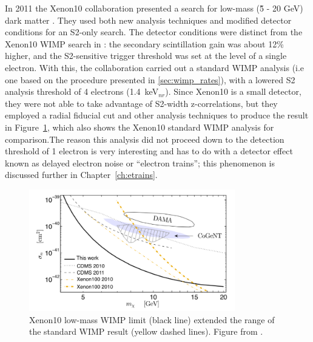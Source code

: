 In 2011 the Xenon10 collaboration presented a search for low-mass (\~5 - 20 GeV) dark matter \cite{Angle2011}. They used both new analysis techniques and modified detector conditions for an S2-only search. The detector conditions were distinct from the Xenon10 \ac{WIMP} search in \cite{Xenon10WIMP}: the secondary scintillation gain was about 12\% higher, and the S2-sensitive trigger threshold was set at the level of a single electron. With this, the collaboration carried out a standard \ac{WIMP} analysis (i.e one based on the procedure presented in \ref{sec:wimp_rates}), with a lowered S2 analysis threshold of 4 electrons (1.4~keV$_{nr}$). Since Xenon10 is a small detector, they were not able to take advantage of S2-width z-correlations, but they employed a radial fiducial cut and other analysis techniques to produce the result in Figure~\ref{fig:xenon10lowmass}, which also shows the Xenon10 standard \ac{WIMP} analysis for comparison.The reason this analysis did not proceed down to the detection threshold of 1 electron is very interesting and has to do with a detector effect known as delayed electron noise or ``electron trains''; this phenomenon is discussed further in Chapter~\ref{ch:etrains}. 

\begin{figure}[htbp]
\begin{center}
\includegraphics[width=0.8\textwidth]{figures/lxetpcs/xenon10lowmass.png}
\caption{Xenon10 low-mass \acs{WIMP} limit (black line) extended the range of the standard \acs{WIMP} result (yellow dashed lines). Figure from \cite{Angle2011}. }
\label{fig:xenon10lowmass}
\end{center}
\end{figure}


